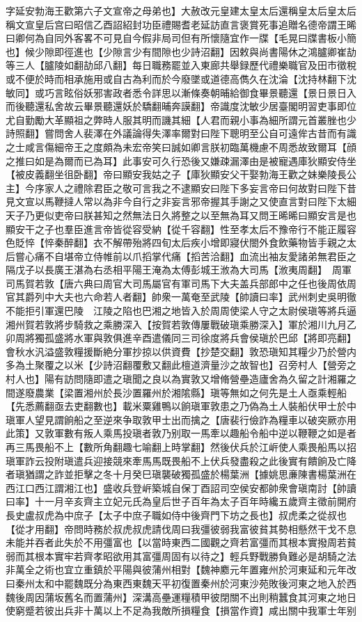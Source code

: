 字延安勃海王歡第六子文宣帝之母弟也】大赦改元皇建太皇太后還稱皇太后皇太后稱文宣皇后宫曰昭信乙酉詔紹封功臣禮賜耆老延訪直言褒賞死事追贈名德帝謂王晞曰卿何為自同外客畧不可見自今假非局司但有所懷隨宜作一牒【毛晃曰牒書板小簡也】候少隙即徑進也【少隙言少有間隙也少詩沼翻】因敕與尚書陽休之鴻臚卿崔劼等三人【臚陵如翻劼邱八翻】每日職務罷並入東廊共舉録歷代禮樂職官及田市徵稅或不便於時而相承施用或自古為利而於今廢墜或道德高儁久在沈淪【沈持林翻下沈敏同】或巧言眩俗妖邪害政者悉令詳思以漸條奏朝晡給御食畢景聽還【景日景日入而後聽還私舍故云畢景聽還妖於驕翻晡奔謨翻】帝識度沈敏少居臺閣明習吏事即位尤自勤勵大革顯祖之弊時人服其明而譏其細【人君而親小事為細所謂元首叢脞也少詩照翻】嘗問舍人裴澤在外議論得失澤率爾對曰陛下聰明至公自可遠侔古昔而有識之士咸言傷細帝王之度頗為未宏帝笑曰誠如卿言朕初臨萬機慮不周悉故致爾耳【顔之推曰如是為爾而已為耳】此事安可久行恐後又嫌疎漏澤由是被寵遇庫狄顯安侍坐【被皮義翻坐徂卧翻】帝曰顯安我姑之子【庫狄顯安父干娶勃海王歡之妹樂陵長公主】今序家人之禮除君臣之敬可言我之不逮顯安曰陛下多妄言帝曰何故對曰陛下昔見文宣以馬鞭撻人常以為非今自行之非妄言邪帝握其手謝之又使直言對曰陛下太細天子乃更似吏帝曰朕甚知之然無法日久將整之以至無為耳又問王晞晞曰顯安言是也顯安干之子也羣臣進言帝皆從容受納【從千容翻】性至孝太后不豫帝行不能正履容色貶悴【悴秦醉翻】衣不解帶殆將四旬太后疾小增即寢伏閤外食飲藥物皆手親之太后嘗心痛不自堪帝立侍帷前以爪搯掌代痛【搯苦洽翻】血流出袖友愛諸弟無君臣之隔戊子以長廣王湛為右丞相平陽王淹為太傅彭城王浟為大司馬【浟夷周翻】　周軍司馬賀若敦【唐六典曰周官大司馬屬官有軍司馬下大夫盖兵部郎中之任也後周依周官其爵列中大夫也六命若人者翻】帥衆一萬奄至武陵【帥讀曰率】武州刺史吳明徹不能拒引軍還巴陵　江陵之陷也巴湘之地皆入於周周使梁人守之太尉侯瑱等將兵逼湘州賀若敦將步騎救之乘勝深入【按賀若敦傳屢戰破瑱乘勝深入】軍於湘川九月乙卯周將獨孤盛將水軍與敦俱進辛酉遣儀同三司徐度將兵會侯瑱於巴邱【將即亮翻】會秋水汎溢盛敦糧援斷絶分軍抄掠以供資費【抄楚交翻】敦恐瑱知其糧少乃於營内多為土聚覆之以米【少詩沼翻覆敷又翻此檀道濟量沙之故智也】召旁村人【營旁之村人也】陽有訪問隨即遣之瑱聞之良以為實敦又增脩營壘造廬舍為久留之計湘羅之間遂廢農業【梁置湘州於長沙置羅州於湘隂縣】瑱等無如之何先是土人亟乘輕船【先悉薦翻亟去吏翻數也】載米粟雞鴨以餉瑱軍敦患之乃偽為土人裝船伏甲士於中瑱軍人望見謂餉船之至逆來争取敦甲士出而擒之【唐裴行儉詐為糧車以破突厥亦用此策】又敦軍數有叛人乘馬投瑱者敦乃别取一馬牽以趣船令船中逆以鞭鞭之如是者再三馬畏船不上【數所角翻趣七喻翻上時掌翻】然後伏兵於江㟁使人乘畏船馬以招瑱軍詐云投附瑱遣兵迎接競來牽馬馬既畏船不上伏兵發盡殺之此後實有饋餉及亡降者瑱猶謂之詐並拒擊之冬十月癸巳瑱襲破獨孤盛於楊葉洲【據姚思亷陳書楊葉洲在西江口西江謂湘江也】盛收兵登㟁築城自保丁酉詔司空侯安都帥衆會瑱南討【帥讀曰率】十一月辛亥齊主立妃元氏為皇后世子百年為太子百年時纔五歲齊主徵前開府長史盧叔虎為中庶子【太子中庶子職如侍中後齊門下坊之長也】叔虎柔之從叔也【從才用翻】帝問時務於叔虎叔虎請伐周曰我彊彼弱我富彼貧其勢相懸然干戈不息未能并吞者此失於不用彊富也【以當時東西二國觀之齊若富彊而其根本實撥周若貧弱而其根本實牢若齊孝昭欲用其富彊周固有以待之】輕兵野戰勝負難必是胡騎之法非萬全之術也宜立重鎮於平陽與彼蒲州相對【魏神䴥元年置雍州於河東延和元年改曰秦州太和中罷魏既分為東西東魏天平初復置秦州於河東沙苑敗後河東之地入於西魏後周因蒲坂舊名而置蒲州】深溝高壘運糧積甲彼閉關不出則稍蠶食其河東之地日使窮蹙若彼出兵非十萬以上不足為我敵所損糧食【損當作資】咸出關中我軍士年别